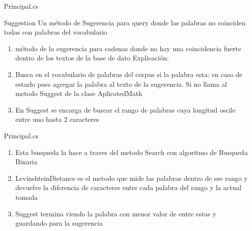 \begin{frame}[fragile]{Principal.cs}
  \begin {center} {Suggestion}
   Un m\'etodo de Sugerencia para query donde las palabras no coinciden todas con palabras del 
    vocabulario
    \begin{enumerate}
        \item m\'etodo de la sugerencia para cadenas donde no hay una coincidencia fuerte dentro de los textos de la base de dato
        Explicaci\'on:
    
    \item  Busca en el vocabulario de palabras del corpus si la palabra esta: en caso de estarlo pues
    agregar la palabra al texto de la sugerencia. Si no llama al metodo Suggest de la clase AplicatedMath
    \item  En Suggest se encarga de buscar el rango de palabras cuya longitud oscile entre uno hasta 2 caracteres
  \end{enumerate}
\end{center}
\end{frame}
\begin{frame}[fragile]{Principal.cs}
  \begin{enumerate}
    \item Esta busqueda la hace a traves del metodo Search con algoritmo de Busqueda Binaria
    \item  LevinshteinDistance es el metodo que mide las palabras dentro de ese rango y devuelve la diferencia de
    caracteres entre cada palabra del rango y la actual tomada
    \item  Suggest termina viendo la palabra con menor valor de entre estas y guardando para la sugerencia
    
  \end{enumerate}
\end{frame}